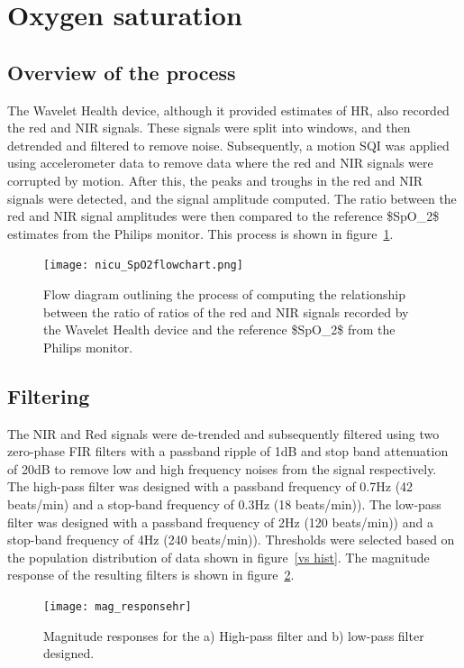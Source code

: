 \section{Oxygen saturation}
\subsection{Overview of the process}

The Wavelet Health device, although it provided estimates of HR, also recorded the red and NIR signals. These signals were split into windows, and then detrended and filtered to remove noise. Subsequently, a motion SQI was applied using accelerometer data to remove data where the red and NIR signals were corrupted by motion. After this, the peaks and troughs in the red and NIR signals were detected, and the signal amplitude computed. The ratio between the red and NIR signal amplitudes were then compared to the reference \gls{$SpO_2$} estimates from the Philips monitor. This process is shown in figure~\ref{spo2flow}. 


\begin{figure}[!ht]
  \centering
    \texttt{[image: nicu\_SpO2flowchart.png]}
    \caption{Flow diagram outlining the process of computing the relationship between the ratio of ratios of the red and NIR signals recorded by the Wavelet Health device and the reference \gls{$SpO_2$} from the Philips monitor.}
        \label{spo2flow}
\end{figure}


\subsection{Filtering}

The NIR and Red signals were de-trended and subsequently filtered using two zero-phase FIR filters with a passband ripple of 1dB and stop band attenuation of 20dB to remove low and high frequency noises from the signal respectively. The high-pass filter was designed with a passband frequency of  0.7Hz (42 beats/min) and a stop-band frequency of 0.3Hz (18 beats/min)). The low-pass filter was designed with a passband frequency of 2Hz (120 beats/min)) and a stop-band frequency of 4Hz (240 beats/min)). Thresholds were selected based on the population distribution of data shown in figure~\ref{vs hist}. The magnitude response of the resulting filters is shown in figure~\ref{mag_Spo2}. 

\begin{figure}[!ht]
\centering
\texttt{[image: mag\_responsehr]}
    \caption[Magnitude responses.]{Magnitude responses for the a) High-pass filter and b) low-pass filter designed.}
        \label{mag_Spo2}
\end{figure}

